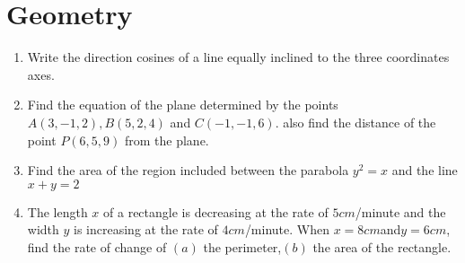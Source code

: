\documentclass{article}
\begin{document}
\section*{Geometry}
\begin{enumerate}
\item 
Write the direction cosines of a line equally inclined to the three coordinates axes. 
\item 
Find the equation of the plane determined by the points $A(3, -1, 2), B(5, 2, 4)$ and $C(-1, -1, 6)$. also find the distance of the point $P(6, 5, 9)$ from the plane.
\item 
Find the area of the region included between the parabola ${y}^ {2} = x$ and the line $x + y = 2$
\item 
The length $x$ of a rectangle is decreasing at the rate of $5 cm$/minute and the width $y$ is increasing at the rate of $4 cm$/minute. When $x = 8 cm $and$ y = 6 cm$, find the rate of change of $(a)$ the perimeter,$ (b)$ the area of the rectangle.
\end{enumerate}
\end{document}
